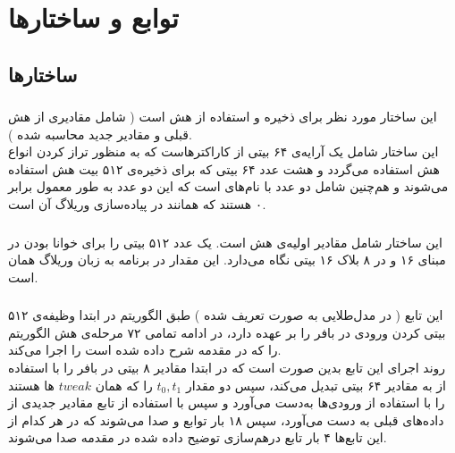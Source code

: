 \chapter{توابع و ساختارها}

\section{ \textbf{ساختارها}}

\subsection{}
\label{subsec:sph-skein-big-context}
این ساختار مورد نظر برای ذخیره و استفاده از هش است (‌ شامل مقادیری از هش قبلی و مقادیر جدید محاسبه شده ). \\ این ساختار شامل یک آرایه‌ی ۶۴ بیتی از کاراکترهاست که به منظور تراز کردن انواع هش استفاده می‌گردد و  هشت عدد ۶۴ بیتی  که برای ذخیره‌ی ۵۱۲ بیت هش  استفاده می‌شوند  و هم‌چنین شامل دو عدد با نام‌های  است که این دو عدد به طور معمول برابر ۰ هستند که همانند  در پیاده‌سازی وریلاگ آن است.



\subsection{}
\label{subsec:IV512}
این ساختار شامل مقادیر اولیه‌ی هش است. یک عدد ۵۱۲ بیتی را برای خوانا بودن در مبنای ۱۶ و در ۸ بلاک ۱۶ بیتی نگاه می‌دارد. این مقدار در برنامه‌ به زبان وریلاگ همان  است.
\subsection{}
\label{subsec:UBI-BIG}
این تابع  (  در مدل‌طلایی به صورت  تعریف شده )  طبق الگوریتم  در ابتدا وظیفه‌ی ۵۱۲ بیتی کردن ورودی در بافر را بر عهده دارد، در ادامه تمامی ۷۲ مرحله‌ی هش الگوریتم  را که در مقدمه شرح داده شده است را اجرا می‌کند.
\\
روند اجرای این تابع بدین صورت است که در ابتدا مقادیر ۸ بیتی در بافر را با استفاده از  به مقادیر ۶۴ بیتی تبدیل می‌کند، سپس دو مقدار $t_0 , t_1$
را که همان $ tweak $ ها هستند را با استفاده از ورودی‌ها به‌دست می‌آورد و سپس با استفاده از تابع \hyperref[subsec:TFBIG-INIT]{} مقادیر جدیدی از داده‌های قبلی به دست می‌آورد،‌ سپس ۱۸ بار توابع \hyperref[subsec:TFBIG-4e]{} و \hyperref[subsec:TFBIG-4o]{} صدا می‌شوند که در هر کدام از‌ این تابع‌ها ۴ بار تابع درهم‌سازی توضیح داده شده در مقدمه صدا می‌شوند.


